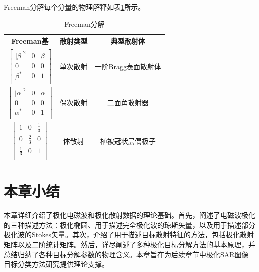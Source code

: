 Freeman分解每个分量的物理解释如表\ref{Freeman table}所示。
\begin{table}[!ht]
    \caption{Freeman分解}
    \begin{tabular}{ccc}
        \toprule[1.5bp]
        Freeman基                                   & 散射类型 & 典型散射体 \\
        \midrule[0.75bp]
        $\left[ \begin{matrix}
                            \left| \beta \right|^2 & 0 & \beta \\
                            0                      & 0 & 0     \\
                            \beta ^*               & 0 & 1     \\
                        \end{matrix} \right]$      & 单次散射 & 一阶Bragg表面散射体  \\
        $\left[ \begin{matrix}
                            \left| \alpha \right|^2 & 0 & \alpha \\
                            0                       & 0 & 0      \\
                            \alpha ^*               & 0 & 1      \\
                        \end{matrix} \right]$    & 偶次散射 & 二面角散射器          \\
        $\left[ \begin{matrix}
                            1           & 0           & \frac{1}{3} \\
                            0           & \frac{2}{3} & 0           \\
                            \frac{1}{3} & 0           & 1           \\
                        \end{matrix} \right]$ & 体散射  & 植被冠状层偶极子           \\
        \bottomrule[1.5bp]
    \end{tabular}
    \label{Freeman table}
\end{table}

\section{本章小结}
本章详细介绍了极化电磁波和极化散射数据的理论基础。首先，阐述了电磁波极化的三种描述方法：极化椭圆、用于描述完全极化波的琼斯矢量，以及用于描述部分极化波的Stokes矢量。其次，介绍了用于描述目标散射特征的方法，包括极化散射矩阵以及二阶统计矩阵。然后，详尽阐述了多种极化目标分解方法的基本原理，并总结归纳了各种目标分解参数的物理含义。本章旨在为后续章节中极化SAR图像目标分类方法研究提供理论支撑。
